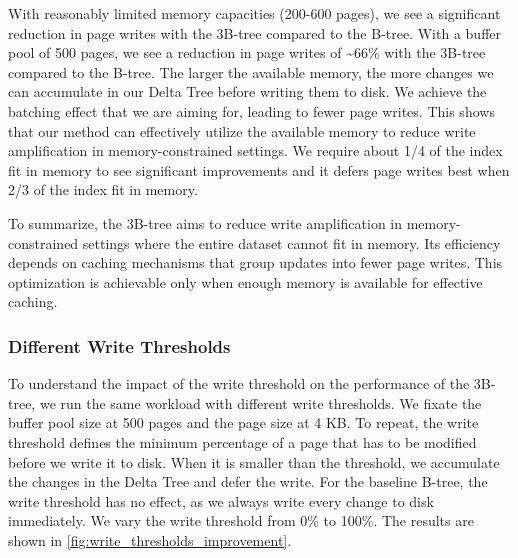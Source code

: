 With reasonably limited memory capacities (200-600 pages), we see a significant reduction in page writes with the 3B-tree compared to the B-tree.
With a buffer pool of 500 pages, we see a reduction in page writes of \textasciitilde66\% with the 3B-tree compared to the B-tree.
The larger the available memory, the more changes we can accumulate in our Delta Tree before writing them to disk.
We achieve the batching effect that we are aiming for, leading to fewer page writes.
This shows that our method can effectively utilize the available memory to reduce write amplification in memory-constrained settings.
We require about 1/4 of the index fit in memory to see significant improvements and it defers page writes best when 2/3 of the index fit in memory.

To summarize, the 3B-tree aims to reduce write amplification in memory-constrained settings where the entire dataset cannot fit in memory.
Its efficiency depends on caching mechanisms that group updates into fewer page writes. 
This optimization is achievable only when enough memory is available for effective caching.

\subsubsection*{Different Write Thresholds}
To understand the impact of the write threshold on the performance of the 3B-tree, we run the same workload with different write thresholds.
We fixate the buffer pool size at 500 pages and the page size at 4 KB.
To repeat, the write threshold defines the minimum percentage of a page that has to be modified before we write it to disk.
When it is smaller than the threshold, we accumulate the changes in the Delta Tree and defer the write.
For the baseline B-tree, the write threshold has no effect, as we always write every change to disk immediately.
We vary the write threshold from 0\% to 100\%.
The results are shown in \autoref{fig:write_thresholds_improvement}.

